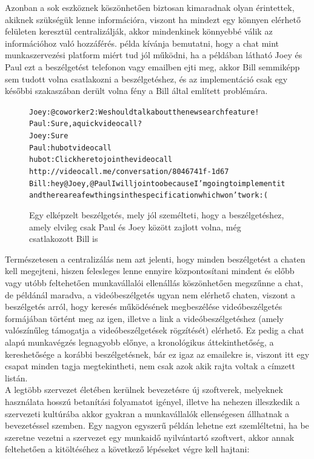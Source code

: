 Azonban a sok eszköznek köszönhetően biztosan kimaradnak olyan érintettek, akiknek szükségük lenne információra, viszont ha mindezt egy könnyen elérhető felületen keresztül centralizálják, akkor mindenkinek könnyebbé válik az információhoz való hozzáférés.  példa kívánja bemutatni, hogy a chat mint munkaszervezési platform miért tud jól működni, ha a példában látható Joey és Paul ezt a beszélgetést telefonon vagy emailben ejti meg, akkor Bill semmiképp sem tudott volna csatlakozni a beszélgetéshez, és az implementáció csak egy későbbi szakaszában derült volna fény a Bill által említett problémára.

\begin{figure}
  \begin{alltt}
Joey: @coworker2: We should talk about the new search feature!
Paul: Sure, a quick videocall?
Joey: Sure
Paul: hubot videocall
hubot: Click here to join the video call
       http://videocall.me/conversation/8046741f-1d67
Bill: hey @Joey, @Paul I will join too because I'm going to implement it 
      and there are a few things in the specification which won't work :(
  \end{alltt}
  \caption[DUMMY]%
    {Egy elképzelt beszélgetés, mely jól személteti, hogy a beszélgetéshez, amely elvileg csak Paul és Joey között zajlott volna, még csatlakozott Bill is}%
    \label{lst:search_feature_call}
\end{figure}

Természetesen a centralizálás nem azt jelenti, hogy minden beszélgetést a chaten kell megejteni, hiszen felesleges lenne ennyire központosítani mindent és előbb vagy utóbb feltehetően munkavállalói ellenállás köszönhetően megszűnne a chat, de  példánál maradva, a videóbeszélgetés ugyan nem elérhető chaten, viszont a beszélgetés arról, hogy keresés működésének megbeszélése videóbeszélgetés formájában történt meg az igen, illetve a link a videóbeszélgetéshez (amely valószínűleg támogatja a videóbeszélgetések rögzítését) elérhető. Ez pedig a chat alapú munkavégzés legnagyobb előnye, a kronológikus áttekinthetőség, a kereshetősége a korábbi beszélgetésnek, bár ez igaz az emailekre is, viszont itt egy csapat minden tagja megtekintheti, nem csak azok akik rajta voltak a címzett listán.\\

A legtöbb szervezet életében kerülnek bevezetésre új szoftverek, melyeknek használata hosszú betanítási folyamatot igényel, illetve ha nehezen illeszkedik a szervezeti kultúrába akkor gyakran a munkavállalók ellenségesen állhatnak a bevezetéssel szemben. Egy nagyon egyszerű példán lehetne ezt szemléltetni, ha be szeretne vezetni a szervezet egy munkaidő nyilvántartó szoftvert, akkor annak feltehetően a kitöltéséhez a következő lépéseket végre kell hajtani:

